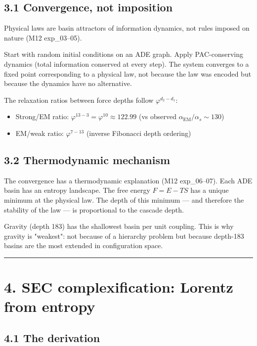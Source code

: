 \documentclass[11pt,a4paper]{article}
\providecommand{\tightlist}{\setlength{\itemsep}{0pt}\setlength{\parskip}{0pt}}
\begin{document}
\subsection*{3.1 Convergence, not imposition}

Physical laws are basin attractors of information dynamics, not rules imposed on nature (M12 exp\_03–05).

Start with random initial conditions on an ADE graph. Apply PAC-conserving dynamics (total information conserved at every step). The system converges to a fixed point corresponding to a physical law, not because the law was encoded but because the dynamics have no alternative.

The relaxation ratios between force depths follow $\varphi^{d_2 - d_1}$:
\begin{itemize}\tightlist
\item Strong/EM ratio: $\varphi^{13-3} = \varphi^{10} \approx 122.99$ (vs observed $\alpha_{\text{EM}}/\alpha_s \sim 130$)
\item EM/weak ratio: $\varphi^{7-13}$ (inverse Fibonacci depth ordering)
\end{itemize}

\subsection*{3.2 Thermodynamic mechanism}

The convergence has a thermodynamic explanation (M12 exp\_06–07). Each ADE basin has an entropy landscape. The free energy $F = E - TS$ has a unique minimum at the physical law. The depth of this minimum — and therefore the stability of the law — is proportional to the cascade depth.

Gravity (depth 183) has the shallowest basin per unit coupling. This is why gravity is "weakest": not because of a hierarchy problem but because depth-183 basins are the most extended in configuration space.

\begin{center}\rule{0.5\linewidth}{0.4pt}\end{center}

\section*{4. SEC complexification: Lorentz from entropy}

\subsection*{4.1 The derivation}
\end{document}
